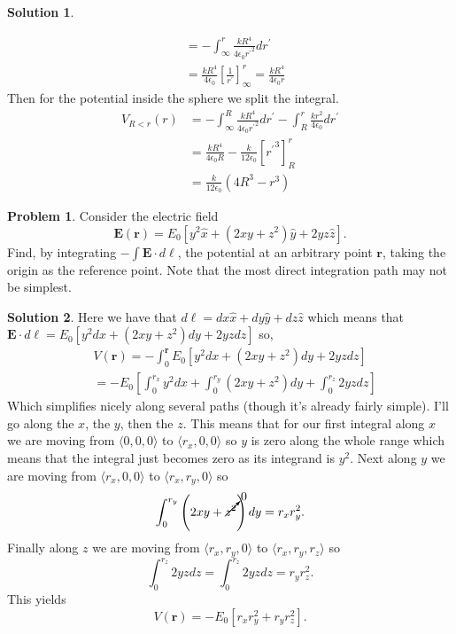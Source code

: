 \documentclass[10pt]{article}
\theoremstyle{definition}
\newtheorem{problem}{Problem}
\newtheorem{soln}{Solution}
\newcommand{\ux}{\hat{x}}
\newcommand{\uy}{\hat{y}}
\newcommand{\uz}{\hat{z}}
\newcommand{\primed}[1]{#1^\prime}
\begin{document}
\begin{soln}
\begin{enumerate}[label=(\roman*)]
\begin{align*}
                       & =-\int_\infty^r\frac{kR^4}{4\epsilon_0 {\primed{r}}^2}d\primed{r}                             \\
                       & =\frac{kR^4}{4\epsilon_0}\left[\frac{1}{\primed{r}}\right]_\infty^r=\frac{kR^4}{4\epsilon_0r}
          \end{align*}
          Then for the potential inside the sphere we split the integral. 
          \begin{align*}
            V_{R<r}(r) & =-\int_\infty^R\frac{kR^4}{4\epsilon_0 {\primed{r}}^2}d\primed{r}-\int_R^r\frac{kr^2}{4\epsilon_0}d\primed{r} \\
                       & =\frac{kR^4}{4\epsilon_0R}-\frac{k}{12\epsilon_0}\left[{\primed{r}}^3\right]_R^r                              \\
                       & =\frac{k}{12\epsilon_0}\left(4R^3-r^3\right)
          \end{align*}
  \end{enumerate}
\end{soln}

\begin{problem}
Consider the electric field
$$\mathbf{E}(\mathbf{r})=E_0\left[y^2\ux+\left(2xy+z^2\right)\uy+2yz\uz\right].$$
Find, by integrating $-\int\mathbf{E}\cdot d\boldsymbol{\ell}$, the potential at an arbitrary point $\mathbf{r}$, taking the origin as the reference point.
Note that the most direct integration path may not be simplest.
\end{problem}
\begin{soln}
  Here we have that $d\boldsymbol{\ell}=dx\ux+dy\uy+dz\uz$ which means that
  $\mathbf{E}\cdot d\boldsymbol{\ell}=E_0\left[y^2dx+\left(2xy+z^2\right)dy+2yzdz\right]$ so,
  \begin{align*}
     & V(\mathbf{r})= -\int_0^{\mathbf{r}}E_0\left[y^2dx+\left(2xy+z^2\right)dy+2yzdz\right]     \\
     & = -E_0\left[\int_0^{r_x}y^2dx+\int_0^{r_y}\left(2xy+z^2\right)dy+\int_0^{r_z}2yzdz\right]
  \end{align*}
  Which simplifies nicely along several paths (though it's already fairly simple). I'll go along the $x$, the $y$, then the $z$.
  This means that for our first integral along $x$ we are moving from $\langle0,0,0\rangle$ to $\langle r_x,0,0\rangle$ so $y$ is zero
  along the whole range which means that the integral just becomes zero as its integrand is $y^2$. Next along
  $y$ we are moving from $\langle r_x,0,0\rangle$ to $\langle r_x,r_y,0\rangle$ so
  $$\int_0^{r_y}\left(2xy+\cancelto{0}{z^2}\right)dy=r_xr_y^2.$$
  Finally along $z$ we are moving from $\langle r_x,r_y,0\rangle$ to $\langle r_x,r_y,r_z\rangle$ so
  $$\int_0^{r_z}2yzdz=\int_0^{r_z}2yzdz=r_yr_z^2.$$
  This yields
  $$V(\mathbf{r})=-E_0\left[r_xr_y^2 + r_yr_z^2\right].$$
\end{soln}
\end{document}
